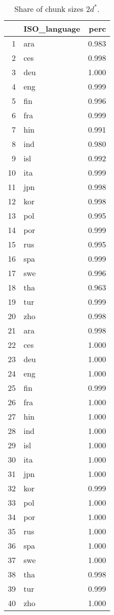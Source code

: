 \begin{table}[H]
\centering
\caption{Share of chunk sizes \leq $2d^*$.} 
\begin{tabular}{rlr}
  \hline
 & ISO\_language & perc \\ 
  \hline
1 & ara & 0.983 \\ 
  2 & ces & 0.998 \\ 
  3 & deu & 1.000 \\ 
  4 & eng & 0.999 \\ 
  5 & fin & 0.996 \\ 
  6 & fra & 0.999 \\ 
  7 & hin & 0.991 \\ 
  8 & ind & 0.980 \\ 
  9 & isl & 0.992 \\ 
  10 & ita & 0.999 \\ 
  11 & jpn & 0.998 \\ 
  12 & kor & 0.998 \\ 
  13 & pol & 0.995 \\ 
  14 & por & 0.999 \\ 
  15 & rus & 0.995 \\ 
  16 & spa & 0.999 \\ 
  17 & swe & 0.996 \\ 
  18 & tha & 0.963 \\ 
  19 & tur & 0.999 \\ 
  20 & zho & 0.998 \\ 
  21 & ara & 0.998 \\ 
  22 & ces & 1.000 \\ 
  23 & deu & 1.000 \\ 
  24 & eng & 1.000 \\ 
  25 & fin & 0.999 \\ 
  26 & fra & 1.000 \\ 
  27 & hin & 1.000 \\ 
  28 & ind & 1.000 \\ 
  29 & isl & 1.000 \\ 
  30 & ita & 1.000 \\ 
  31 & jpn & 1.000 \\ 
  32 & kor & 0.999 \\ 
  33 & pol & 1.000 \\ 
  34 & por & 1.000 \\ 
  35 & rus & 1.000 \\ 
  36 & spa & 1.000 \\ 
  37 & swe & 1.000 \\ 
  38 & tha & 0.998 \\ 
  39 & tur & 0.999 \\ 
  40 & zho & 1.000 \\ 
   \hline
\end{tabular}
\end{table}
